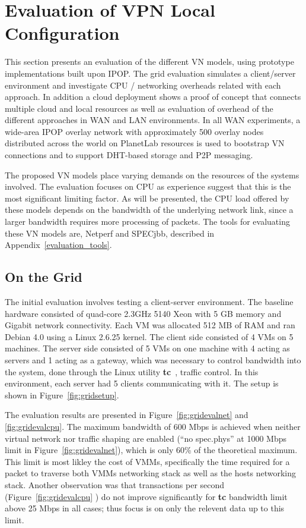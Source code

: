 \section{Evaluation of VPN Local Configuration}
This section presents an evaluation of the different VN models, using prototype
implementations built upon IPOP.  The grid evaluation simulates a client/server
environment and investigate CPU / networking overheads related with each
approach.  In addition a cloud deployment shows a proof of concept that connects
multiple cloud and local resources as well as evaluation of overhead of the
different approaches in WAN and LAN environments.  In all WAN experiments, a
wide-area IPOP overlay network with approximately 500 overlay nodes distributed
across the world on PlanetLab resources is used to bootstrap VN connections and
to support DHT-based storage and P2P messaging.

The proposed VN models place varying demands on the resources of the systems
involved. The evaluation focuses on CPU as experience suggest that this is the
most significant limiting factor.  As will be presented, the CPU load offered
by these models depends on the bandwidth of the underlying network link, since
a larger bandwidth requires more processing of packets.  The tools for
evaluating these VN models are, Netperf and SPECjbb, described in
Appendix~\ref{evaluation_tools}.

\subsection{On the Grid}
The initial evaluation involves testing a client-server environment.  The
baseline hardware consisted of quad-core 2.3GHz 5140 Xeon with 5 GB memory and
Gigabit network connectivity.  Each VM was allocated 512 MB of RAM and ran
Debian 4.0 using a Linux 2.6.25 kernel.  The client side consisted of 4 VMs on
5 machines.  The server side consisted of 5 VMs on one machine with 4 acting
as servers and 1 acting as a gateway, which was necessary to control bandwidth
into the system, done through the Linux utility \textbf{tc}~\cite{tc}, traffic
control.  In this environment, each server had 5 clients communicating with it.
The setup is shown in Figure~\ref{fig:gridsetup}.

The evaluation results are presented in Figure~\ref{fig:gridevalnet} and
\ref{fig:gridevalcpu}.  The maximum bandwidth of 600 Mbps is achieved when
neither virtual network nor traffic shaping are enabled (``no spec.phys'' at
1000 Mbps limit in Figure~\ref{fig:gridevalnet}),
which is only 60\% of the theoretical maximum.  This limit is most likley the
cost of VMMs, specifically the time required for a packet to traverse both VMMs
networking stack as well as the hosts networking stack.  Another observation
was that transactions per second (Figure~\ref{fig:gridevalcpu}
) do not improve significantly for \textbf{tc} bandwidth
limit above 25 Mbps in all cases; thus focus is on only the relevent data up to
this limit.

